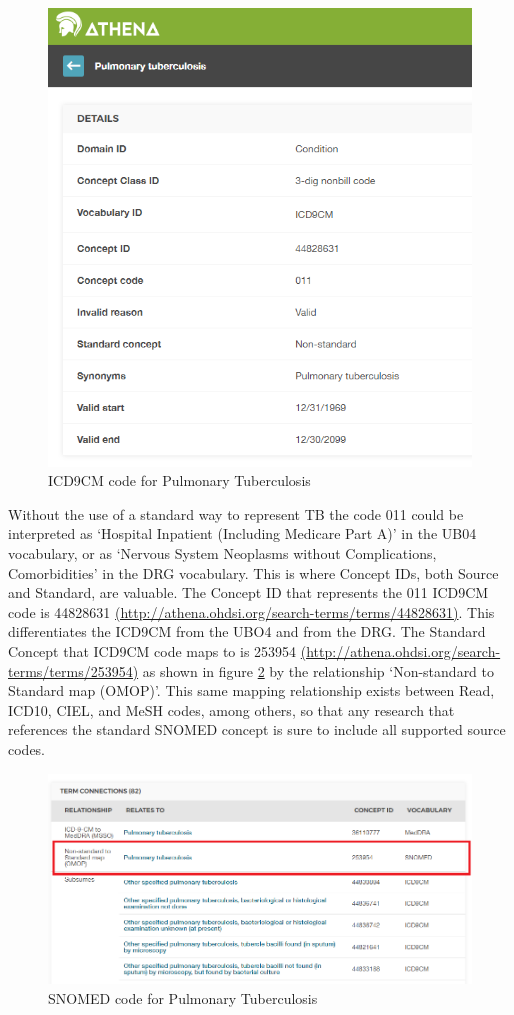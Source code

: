 \documentclass[]{book}
\begin{document}
\begin{figure}
\includegraphics[width=0.75\linewidth]{images/CommonDataModel/pulmTubICD9} \caption{ICD9CM code for Pulmonary Tuberculosis}\label{fig:pulmTubICD9}
\end{figure}

Without the use of a standard way to represent TB the code 011 could be interpreted as `Hospital Inpatient (Including Medicare Part A)' in the UB04 vocabulary, or as `Nervous System Neoplasms without Complications, Comorbidities' in the DRG vocabulary. This is where Concept IDs, both Source and Standard, are valuable. The Concept ID that represents the 011 ICD9CM code is 44828631 \href{http://athena.ohdsi.org/search-terms/terms/44828631}{(http://athena.ohdsi.org/search-terms/terms/44828631)}. This differentiates the ICD9CM from the UBO4 and from the DRG. The Standard Concept that ICD9CM code maps to is 253954 \href{http://athena.ohdsi.org/search-terms/terms/253954}{(http://athena.ohdsi.org/search-terms/terms/253954)} as shown in figure \ref{fig:pulmTubMap} by the relationship `Non-standard to Standard map (OMOP)'. This same mapping relationship exists between Read, ICD10, CIEL, and MeSH codes, among others, so that any research that references the standard SNOMED concept is sure to include all supported source codes.

\begin{figure}
\includegraphics[width=1\linewidth]{images/CommonDataModel/pulmTubMap} \caption{SNOMED code for Pulmonary Tuberculosis}\label{fig:pulmTubMap}
\end{figure}
\end{document}
